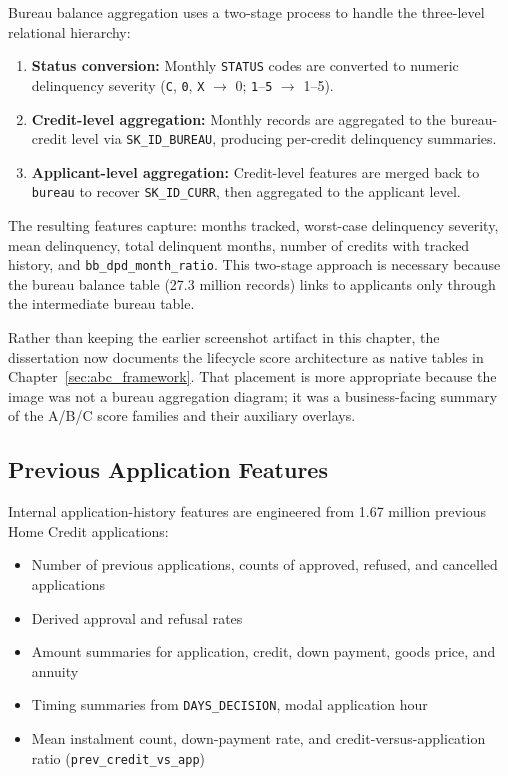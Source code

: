 Bureau balance aggregation uses a two-stage process to handle the three-level relational hierarchy:
\begin{enumerate}
    \item \textbf{Status conversion:} Monthly \texttt{STATUS} codes are converted to numeric delinquency severity (\texttt{C}, \texttt{0}, \texttt{X} $\rightarrow$ 0; \texttt{1}--\texttt{5} $\rightarrow$ 1--5).
    \item \textbf{Credit-level aggregation:} Monthly records are aggregated to the bureau-credit level via \texttt{SK\_ID\_BUREAU}, producing per-credit delinquency summaries.
    \item \textbf{Applicant-level aggregation:} Credit-level features are merged back to \texttt{bureau} to recover \texttt{SK\_ID\_CURR}, then aggregated to the applicant level.
\end{enumerate}

The resulting features capture: months tracked, worst-case delinquency severity, mean delinquency, total delinquent months, number of credits with tracked history, and \texttt{bb\_dpd\_month\_ratio}. This two-stage approach is necessary because the bureau balance table (27.3 million records) links to applicants only through the intermediate bureau table.

Rather than keeping the earlier screenshot artifact in this chapter, the dissertation now documents the lifecycle score architecture as native tables in Chapter~\ref{sec:abc_framework}. That placement is more appropriate because the image was not a bureau aggregation diagram; it was a business-facing summary of the A/B/C score families and their auxiliary overlays.

\subsection{Previous Application Features}

Internal application-history features are engineered from 1.67 million previous Home Credit applications:

\begin{itemize}
    \item Number of previous applications, counts of approved, refused, and cancelled applications
    \item Derived approval and refusal rates
    \item Amount summaries for application, credit, down payment, goods price, and annuity
    \item Timing summaries from \texttt{DAYS\_DECISION}, modal application hour
    \item Mean instalment count, down-payment rate, and credit-versus-application ratio (\texttt{prev\_credit\_vs\_app})
\end{itemize}

